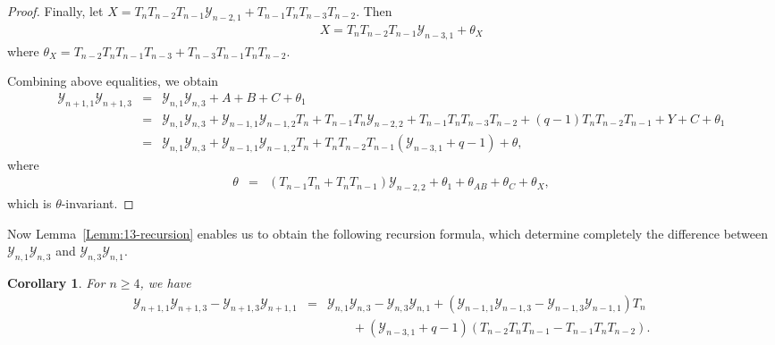 \documentclass[13pt,a4paper, oneside]{amsart}       %
\numberwithin{equation}{section}
\newtheorem{corollary}[equation]{Corollary}
\theoremstyle{definition}
\theoremstyle{remark}
\begin{document}
\begin{CJK*}{GBK}{song}
\begin{proof}
Finally, let $X=T_nT_{n-2}T_{n-1}\mathscr{Y}_{n-2,1}+
T_{n-1}T_nT_{n-3}T_{n-2}$. Then
\begin{eqnarray*}
&&X=T_nT_{n-2}T_{n-1}\mathscr{Y}_{n-3,1}+\theta_X
\end{eqnarray*}
where $\theta_X=T_{n-2}T_nT_{n-1}T_{n-3}+
T_{n-3}T_{n-1}T_nT_{n-2}$.

Combining above equalities, we obtain
\begin{eqnarray*}
 \mathscr{Y}_{n\!+\!1,1}\mathscr{Y}_{n\!+\!1,3}\!\!&=&\!
\mathscr{Y}_{n,1}\mathscr{Y}_{n,3}
 \!+\!A\!+\!B\!+\!C\!+\!\theta_1\\
&=&\mathscr{Y}_{n,1}\mathscr{Y}_{n,3}+\mathscr{Y}_{n\!-\!1,1}
\mathscr{Y}_{n\!-\!1,2}T_n\!+\!T_{n\!-\!1}T_n\mathscr{Y}_{n\!-\!2,2}
+\!T_{n\!-\!1}T_nT_{n\!-\!3}T_{n\!-\!2}+(q\!-\!1)
T_nT_{n\!-\!2}T_{n\!-\!1}\!+\!Y\!+\!C\!+\!\theta_1\\
\!\!&=&\!\!\mathscr{Y}_{n,1}\mathscr{Y}_{n,3}\!+\!\mathscr{Y}_{n\!-\!1,1}
\mathscr{Y}_{n\!-\!1,2}T_n\!+\!T_nT_{n\!-\!2}T_{n\!-\!1}
(\mathscr{Y}_{n-3,1}+q-1)\!+\!\theta,
\end{eqnarray*}
 where
\begin{eqnarray*}
\theta&=&(T_{n-1}T_n+T_nT_{n-1})\mathscr{Y}_{n-2,2}
+\theta_1+\theta_{AB}+\theta_C+\theta_X,
\end{eqnarray*}
which is $\theta$-invariant.
\end{proof}

Now Lemma~\ref{Lemm:13-recursion} enables us to obtain the following recursion formula, which determine completely the difference between $\mathscr{Y}_{n,1}\mathscr{Y}_{n,3}$ and $\mathscr{Y}_{n,3}\mathscr{Y}_{n,1}$.
\begin{corollary}For $n\geq 4$, we have
\begin{eqnarray*}
\mathscr{Y}_{n\!+\!1,1}\mathscr{Y}_{n\!+\!1,3}\!-\!
\mathscr{Y}_{n\!+\!1,3}\mathscr{Y}_{n\!+\!1,1}&=&
\mathscr{Y}_{n,1}\mathscr{Y}_{n,3}\!-\!
\mathscr{Y}_{n,3}\mathscr{Y}_{n,1}+
(\mathscr{Y}_{n-1,1}\mathscr{Y}_{n-1,3}-
\mathscr{Y}_{n-1,3}\mathscr{Y}_{n-1,1})T_n\\
&&\qquad
+(\mathscr{Y}_{n-3,1}+q-1)
(T_{n-2}T_nT_{n-1}-T_{n-1}T_nT_{n-2}).
\end{eqnarray*}
\end{corollary}


\end{CJK*}
\end{document}

